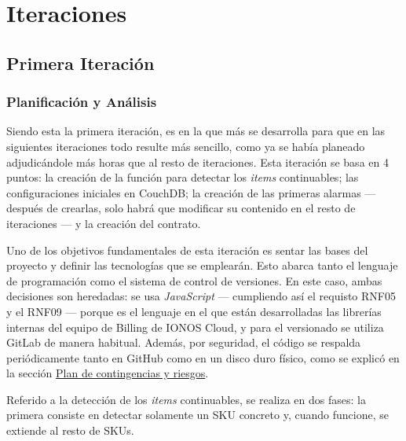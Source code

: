 
\chapter{Iteraciones}\label{chap:iteraciones}
\section{Primera Iteración}
\subsection{Planificación y Análisis}
Siendo esta la primera iteración, es en la que más se desarrolla para que en las siguientes iteraciones todo resulte más sencillo, como ya se había planeado adjudicándole más horas que al resto de iteraciones.
Esta iteración se basa en 4 puntos: la creación de la función para detectar los \textit{items} continuables;
las configuraciones iniciales en CouchDB; la creación de las primeras alarmas --- después de crearlas, solo habrá que modificar su contenido
en el resto de iteraciones --- y la creación del contrato.


\vspace{0.6cm}

Uno de los objetivos fundamentales de esta iteración es sentar las bases del proyecto y definir las tecnologías que se emplearán. Esto abarca tanto el lenguaje de programación como el sistema de control de versiones. En este caso, ambas decisiones son heredadas: se usa \textit{JavaScript} --- cumpliendo así el requisto RNF05 y el RNF09 --- porque es el lenguaje en el que están desarrolladas las librerías internas del equipo de Billing de IONOS Cloud, y para el versionado se utiliza GitLab de manera habitual. Además, por seguridad, el código se respalda periódicamente tanto en GitHub como en un disco duro físico, como se explicó en la sección \hyperref[sec:plan-contingencias]{Plan de contingencias y riesgos}.


\vspace{0.6cm}

Referido a la detección de los \textit{items} continuables, se realiza en dos fases: la primera consiste en detectar solamente un SKU concreto y, cuando funcione, se extiende al resto de SKUs.

\vspace{0.6cm}

